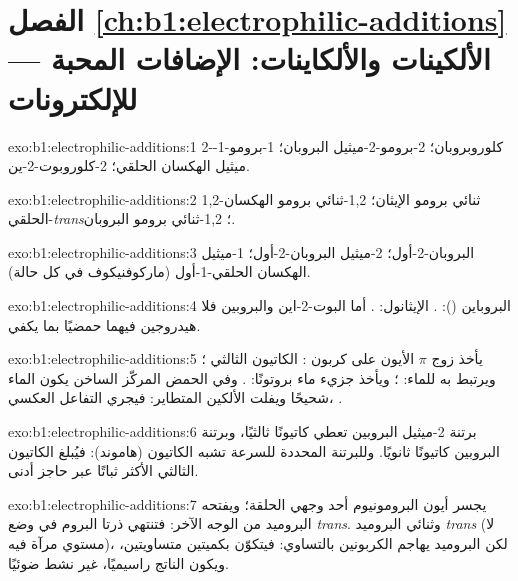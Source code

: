 \section*{الفصل \ref{ch:b1:electrophilic-additions} --- الألكينات والألكاينات: الإضافات المحبة للإلكترونات}

\begin{solution}{exo:b1:electrophilic-additions:1}
2-كلوروبروبان؛ 2-برومو-2-ميثيل البروبان؛ 1-برومو-1-ميثيل الهكسان الحلقي؛
2-كلوروبوت-2-ين.
\end{solution}

\begin{solution}{exo:b1:electrophilic-additions:2}
1,2-ثنائي برومو الإيثان؛ 1,2-ثنائي برومو الهكسان الحلقي-\textit{trans}؛
1,2-ثنائي برومو البروبان.
\end{solution}

\begin{solution}{exo:b1:electrophilic-additions:3}
البروبان-2-أول؛ 2-ميثيل البروبان-2-أول؛ 1-ميثيل الهكسان الحلقي-1-أول (ماركوفنيكوف في
كل حالة).
\end{solution}

\begin{solution}{exo:b1:electrophilic-additions:4}
البروباين (): . الإيثانول:
. أما البوت-2-اين والبروبين فلا هيدروجين
فيهما حمضيًا بما يكفي.
\end{solution}

\begin{solution}{exo:b1:electrophilic-additions:5}
يأخذ زوج $\pi$ الأيون  على كربون : الكاتيون الثالثي
؛ ويرتبط به  للماء: ؛ ويأخذ جزيء
ماء بروتونًا: . وفي الحمض المركّز الساخن يكون الماء
شحيحًا ويفلت الألكين المتطاير: فيجري التفاعل العكسي، .
\end{solution}

\begin{solution}{exo:b1:electrophilic-additions:6}
برتنة 2-ميثيل البروبين تعطي كاتيونًا ثالثيًا، وبرتنة البروبين كاتيونًا
ثانويًا. وللبرتنة المحددة للسرعة 
تشبه الكاتيون (هاموند): فيُبلغ الكاتيون الثالثي الأكثر ثباتًا
عبر حاجز أدنى.
\end{solution}

\begin{solution}{exo:b1:electrophilic-additions:7}
يجسر أيون البرومونيوم أحد وجهي الحلقة؛ ويفتحه البروميد من
الوجه الآخر: فتنتهي ذرتا البروم في وضع \textit{trans}. وثنائي البروميد \textit{trans}
 (لا مستوي مرآة فيه)، لكن البروميد يهاجم الكربونين
بالتساوي: فيتكوّن  بكميتين متساويتين، ويكون الناتج
راسيميًا، غير نشط ضوئيًا.
\end{solution}

